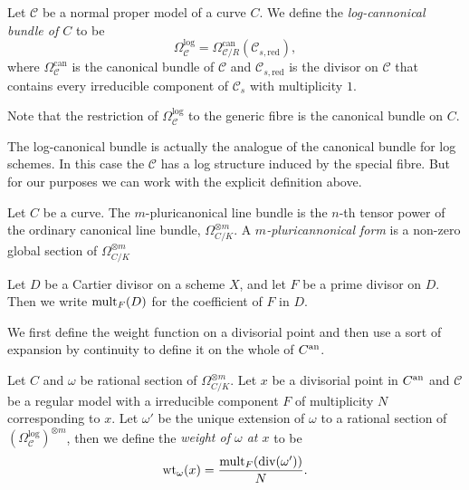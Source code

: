 \begin{definition}\label{def:log_cannonical_bundle}
	Let  $\mathscr C$ be a normal proper model of a curve $C $. 
	We define the \emph{log-cannonical bundle of $C$} to be \[
		\Omega_{\mathscr C}^{\text{log}}  = \Omega_{\mathscr C / R}^{\text{can}}(\mathscr C_{s, \text{red}})
	,\] 
	where $\Omega_{\mathscr C} ^{\text{can}}$ is the canonical bundle of $\mathscr C$ and $\mathscr C_{s, \text{red}}$ is the divisor on $\mathscr C$ that contains every irreducible component of $\mathscr C_s$ with multiplicity $1$.  
\end{definition}

Note that the restriction of $\Omega_{\mathscr C}^{\log}$ to the generic fibre is the canonical bundle on $C$. 

\begin{remark}
	The log-canonical bundle is actually the analogue of the canonical bundle for log schemes. 
	In this case the $\mathscr C$ has a log structure induced by the special fibre. 
	But for our purposes we can work with the explicit definition above. 
\end{remark}
\begin{definition}
	Let $C $ be a curve.
	The $m$-pluricanonical line bundle is the $n$-th tensor power of the ordinary canonical line bundle, $\Omega_{C / K}^{\otimes m }$. 
	A \emph{$m$-pluricannonical form}  is a non-zero global section of $\Omega_{C / K}^{\otimes m }$
\end{definition}
\begin{notation}
	Let $D$ be a Cartier divisor on a scheme $X$, and let $F$ be a prime divisor on $D$. 
	Then we write $\operatorname{mult}_{F}(D)$ for the coefficient of $F$ in $D$. 
\end{notation}

We first define the weight function on a divisorial point and then use a sort of expansion by continuity to define it on the whole of $C{}^{\text{an}}$. 
\begin{definition}\label{def:weight_function_divisorial_point}
	Let $C$ and $\omega$ be rational section of $\Omega_{C / K}^{\otimes m}$.
	Let $x$ be a divisorial point in $C{}^{\text{an}}$ and $\mathscr C$ be a regular model  with a irreducible component $F$ of multiplicity $N$ corresponding to $x$. 
	Let $\omega'$ be the unique extension of $\omega$ to a rational section of $(\Omega_{\mathscr C} ^{\text{log}})^{\otimes m}$, then we define the \emph{weight of $\omega$ at $x$} to be \[
		\operatorname{wt}_\omega(x) = \frac{\operatorname{mult}_F(\operatorname{div}(\omega'))}{N}
	.\] 
\end{definition}

